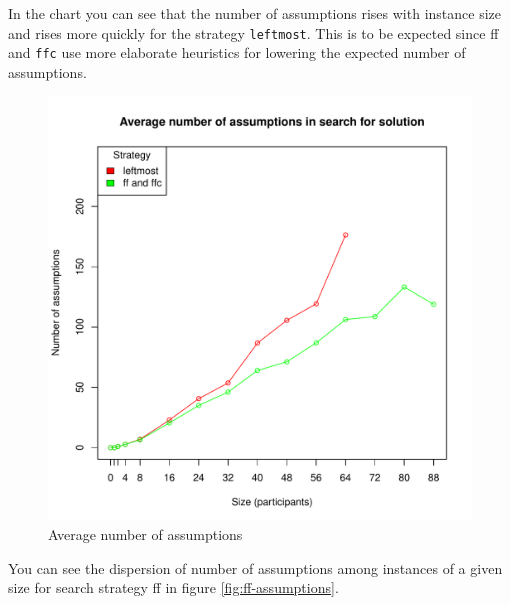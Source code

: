 \documentclass{article}
\newcommand{\code}[1]{\texttt{#1}}
\begin{document}
In the chart you can see that the number of assumptions rises with instance size
and rises more quickly for the strategy \code{leftmost}.
This is to be expected since \acrshort{ff} and \code{ffc} use more elaborate heuristics
for lowering the expected number of assumptions.

\begin{figure}
\centering
\includegraphics[width=\linewidth]{assumptions}
\caption{Average number of assumptions}
\label{fig:assumptions}
\end{figure}

You can see the dispersion of number of assumptions among instances of a given size
for search strategy \acrshort{ff} in figure \ref{fig:ff-assumptions}.
\end{document}
